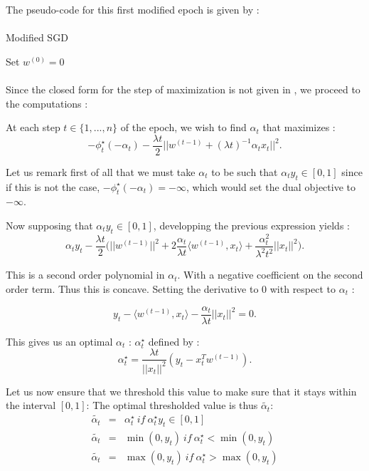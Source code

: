 \documentclass[10pt,a4paper]{article}
\begin{document}
The pseudo-code for this first modified epoch is given by : 

\paragraph{}
\begin{algorithm}[H]
\caption{Modified SGD}
\SetAlgoLined
Set $w^{(0)} = 0$\;
\end{algorithm}



\paragraph{}
Since the closed form for the step of maximization is not given in \cite{1}, we proceed to the computations : 

At each step $t \in \{1,..., n \}$ of the epoch, we wish to find $\alpha_t$ that maximizes : 
$$ - \phi_t^{\star}(-\alpha_t) - \frac{\lambda t}{2} ||w^{(t-1)} + (\lambda t)^{-1} \alpha_t x_t ||^2.$$

Let us remark first of all that we must take $\alpha_t$ to be such that $\alpha_t y_t \in [0, 1]$ since if this is not the case, $- \phi_t^{\star}(-\alpha_t) = - \infty$, which would set the dual objective to $- \infty$.

Now supposing that $\alpha_t y_t \in [0, 1]$, developping the previous expression yields : 
$$ \alpha_t y_t - \frac{\lambda t}{2} \Big ( ||w^{(t-1)}||^2 + 2 \frac{\alpha_t}{\lambda t} \langle w^{(t-1)}, x_t \rangle + \frac{\alpha_t^2}{\lambda^2 t^2}||x_t||^2 \Big).$$

This is a second order polynomial in $\alpha_t$. With a negative coefficient on the second order term. Thus this is concave. Setting the derivative to 0 with respect to $\alpha_t$ : 

$$ y_t - \langle w^{(t-1)}, x_t \rangle - \frac{\alpha_t}{\lambda t}||x_t||^2  = 0.$$


This gives us an optimal $\alpha_t$ : $\alpha_t^{\star}$ defined by :  
$$ \alpha_t^{\star} = \frac{\lambda t}{||x_t||^2} (y_t - x_t^T w^{(t-1)}).$$

Let us now ensure that we threshold this value to make sure that it stays within the interval $[0, 1]$: The optimal thresholded value is thus $\tilde{\alpha_t}$:
\begin{eqnarray*}
    \tilde{\alpha_t} &=& \alpha_t^{\star} ~if~\alpha_t^{\star} y_t \in [0, 1] \\
    \tilde{\alpha_t} &=& \min(0, y_t)~if~\alpha_t^{\star} < \min(0, y_t)\\
    \tilde{\alpha_t} &=& \max(0, y_t)~if~\alpha_t^{\star} > \max(0, y_t)\\
\end{eqnarray*}
\end{document}

